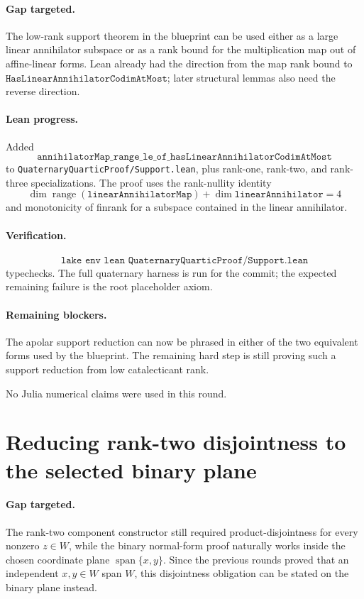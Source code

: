 \documentclass[11pt]{article}
\begin{document}
\paragraph{Gap targeted.}
The low-rank support theorem in the blueprint can be used either as a large
linear annihilator subspace or as a rank bound for the multiplication map out
of affine-linear forms.  Lean already had the direction from the map rank bound
to \(\texttt{HasLinearAnnihilatorCodimAtMost}\); later structural lemmas also
need the reverse direction.

\paragraph{Lean progress.}
Added
\[
\texttt{annihilatorMap\_range\_le\_of\_hasLinearAnnihilatorCodimAtMost}
\]
to \texttt{QuaternaryQuarticProof/Support.lean}, plus rank-one, rank-two, and
rank-three specializations.  The proof uses the rank-nullity identity
\[
\dim\operatorname{range}(\texttt{linearAnnihilatorMap})
+\dim\texttt{linearAnnihilator}=4
\]
and monotonicity of finrank for a subspace contained in the linear
annihilator.

\paragraph{Verification.}
\[
\texttt{lake env lean QuaternaryQuarticProof/Support.lean}
\]
typechecks.  The full quaternary harness is run for the commit; the expected
remaining failure is the root placeholder axiom.

\paragraph{Remaining blockers.}
The apolar support reduction can now be phrased in either of the two equivalent
forms used by the blueprint.  The remaining hard step is still proving such a
support reduction from low catalecticant rank.

No Julia numerical claims were used in this round.

\section*{Reducing rank-two disjointness to the selected binary plane}

\paragraph{Gap targeted.}
The rank-two component constructor still required product-disjointness for
every nonzero \(z\in W\), while the binary normal-form proof naturally works
inside the chosen coordinate plane \(\operatorname{span}\{x,y\}\).  Since the
previous rounds proved that an independent \(x,y\in W\) span \(W\), this
disjointness obligation can be stated on the binary plane instead.
\end{document}
